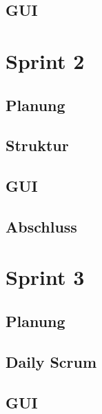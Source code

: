 \documentclass{my_Presentation}
\begin{document}
\subsection*{GUI}

%


\section{Sprint 2}
\subsection*{Planung}

\subsection*{Struktur}

\subsection*{GUI}

\subsection*{Abschluss}



\section{Sprint 3}
\subsection*{Planung}

\subsection*{Daily Scrum}

\subsection*{GUI}


\end{document}
